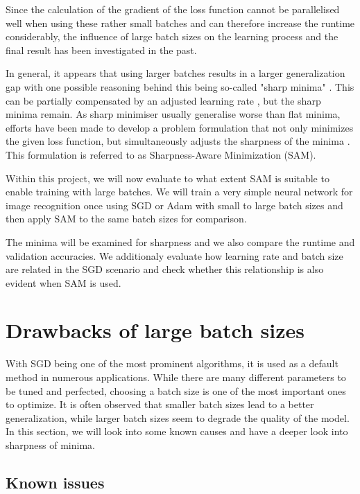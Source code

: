 \documentclass[10pt,conference,compsocconf]{IEEEtran}
\begin{document}
Since the calculation of the gradient of the loss function cannot be parallelised well when using these rather small batches and can therefore increase the runtime considerably, the influence of large batch sizes on the learning process and the final result has been investigated in the past. 

In general, it appears that using larger batches results in a larger generalization gap with one possible reasoning behind this being so-called "sharp minima" \cite{keskar2017largebatch}. This can be partially compensated by an adjusted learning rate \cite{goyal2018accurate}, but the sharp minima remain. 
As sharp minimiser usually generalise worse than flat minima, efforts have been made to develop a problem formulation that not only minimizes the given loss function, but simultaneously adjusts the sharpness of the minima \cite{foret2021sharpnessaware}. This formulation is referred to as Sharpness-Aware Minimization (SAM). 


Within this project, we will now evaluate to what extent SAM is suitable to enable training with large batches. 
We will train a very simple neural network for image recognition once using SGD or Adam with small to large batch sizes and then apply SAM to the same batch sizes for comparison. 

The minima will be examined for sharpness and we also compare the runtime and validation accuracies. 
We additionaly evaluate how learning rate and batch size are related in the SGD scenario and check whether this relationship is also evident when SAM is used. 

\section{Drawbacks of large batch sizes}
\label{sec:drawbacks-large-bs}

With SGD being one of the most prominent algorithms, it is used as a default method in numerous applications. While there are many different parameters to be tuned and perfected, choosing a batch size is one of the most important ones to optimize. It is often observed that smaller batch sizes lead to a better generalization, while larger batch sizes seem to degrade the quality of the model. In this section, we will look into some known causes and have a deeper look into sharpness of minima. 

\subsection{Known issues}
\label{subsec:known-issues}
\end{document}
